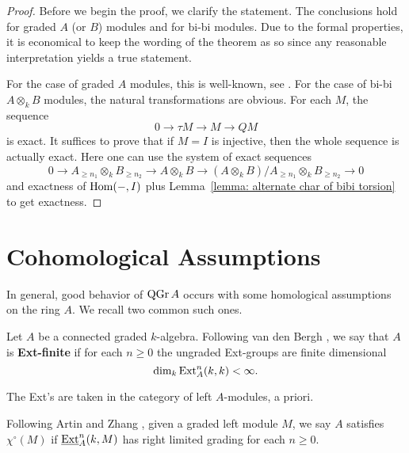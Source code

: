 \begin{proof}
  Before we begin the proof, we clarify the statement. The conclusions hold for graded \(A\) (or \(B\)) modules and for bi-bi modules. Due to the formal properties, it is economical to keep the wording of the theorem as so since any reasonable interpretation yields a true statement. 
  
  For the case of graded \(A\) modules, this is well-known, see \cite[Property 4.6]{BVdB}. For the case of bi-bi \(A \otimes_k B\) modules, the natural transformations are obvious. For each \(M\), the sequence 
  \begin{displaymath}
    0 \to \tau M \to M \to Q M
  \end{displaymath}
  is exact. It suffices to prove that if \(M = I\) is injective, then the whole sequence is actually exact. Here one can use the system of exact sequences
  \begin{displaymath}
    0 \to A_{\geq n_1} \otimes_k B_{\geq n_2} \to A \otimes_k B \to (A \otimes_k B) / A_{\geq n_1} \otimes_k B_{\geq n_2} \to 0
  \end{displaymath}
  and exactness of \(\operatorname{Hom}(-,I)\) plus Lemma~\ref{lemma: alternate char of bibi torsion} to get exactness. 
\end{proof}

\section{Cohomological Assumptions}

In general, good behavior of \(\operatorname{QGr}A\) occurs with some homological assumptions on the ring \(A\). We recall two common such ones. 

\begin{definition} \label{definition: Ext-finite}
  Let \(A\) be a connected graded \(k\)-algebra. Following van den Bergh \cite{VdB}, we say that \(A\) is \textbf{Ext-finite} if for each \(n \geq 0\) the ungraded Ext-groups are finite dimensional 
  \begin{displaymath}
    \operatorname{dim}_k \operatorname{Ext}_A^n (k,k) < \infty.
  \end{displaymath}
\end{definition}

\begin{remark}
  The Ext's are taken in the category of left \(A\)-modules, a priori. 
\end{remark}

\begin{definition} \label{definition: chi}
  Following Artin and Zhang \cite{AZ94}, given a graded left module \(M\), we say \(A\) satisfies \(\chi^\circ(M)\) if \(\underline{\operatorname{Ext}}^n_A(k,M)\) has right limited grading for each \(n \geq 0\). 

\end{definition}


